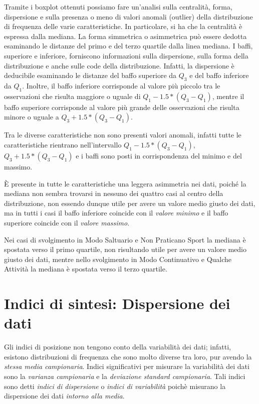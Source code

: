 Tramite i boxplot ottenuti possiamo fare un'analisi sulla centralità, forma, dispersione e sulla presenza o meno di valori anomali (outlier) della distribuzione di frequenza delle varie caratteristiche. In particolare, si ha che la centralità è espressa dalla mediana. La forma simmetrica o asimmetrica può essere dedotta esaminando le distanze del primo e del terzo quartile dalla linea mediana. I baffi, superiore e inferiore, forniscono informazioni sulla dispersione, sulla forma della distribuzione e anche sulle code della distribuzione. Infatti, la dispersione è deducibile esaminando le distanze del baffo superiore da $Q_3$ e del baffo inferiore da $Q_1$. Inoltre, il baffo inferiore corrisponde al valore più piccolo tra le osservazioni che risulta maggiore o uguale di $Q_1 - 1.5 * (Q_3 - Q_1)$, mentre il baffo superiore corrisponde al valore più grande delle osservazioni che risulta minore o uguale a $Q_3 + 1.5 * (Q_3 - Q_1)$. 

Tra le diverse caratteristiche non sono presenti valori anomali, infatti tutte le caratteristiche rientrano nell'intervallo $Q_1 - 1.5 * (Q_3 - Q_1)$, $Q_3 + 1.5 * (Q_3 - Q_1)$ e i baffi sono posti in corrispondenza del minimo e del massimo.

È presente in tutte le caratteristiche una leggera asimmetria nei dati, poiché la mediana non sembra trovarsi in nessuno dei quattro casi al centro della distribuzione, non essendo dunque utile per avere un valore medio giusto dei dati, ma in tutti i casi il baffo inferiore coincide con il \textit{valore minimo} e il baffo superiore coincide con il \textit{valore massimo}.

Nei casi di svolgimento in Modo Saltuario e Non Praticano Sport la mediana è spostata verso il primo quartile, non risultando utile per avere un valore medio giusto dei dati, mentre nello svolgimento in Modo Continuativo e Qualche Attività la mediana è spostata verso il terzo quartile.

\section{Indici di sintesi: Dispersione dei dati}\label{cap3.2}

Gli indici di posizione non tengono conto della variabilità dei dati; infatti, esistono distribuzioni di frequenza che sono molto diverse tra loro, pur avendo la \textit{stessa media campionaria}. Indici significativi per misurare la variabilità dei dati sono la \textit{varianza campionaria} e la \textit{deviazione standard campionaria}. Tali indici sono detti \textit{indici di dispersione} o \textit{indici di variabilità} poichè misurano la dispersione dei dati \textit{intorno alla media}.

